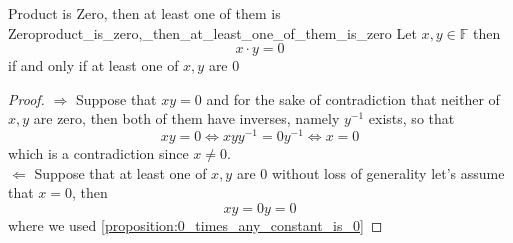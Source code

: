 \begin{proposition}{Product is Zero, then at least one of them is
Zero}{product_is_zero,_then_at_least_one_of_them_is_zero}
Let \(  x, y \in  \mathbb{F} \) then 
\[
x \cdot y =  0
\] 
if and only if at least one of \( x, y \) are \( 0 \) 
\end{proposition}
\begin{proof}
    \( \Rightarrow \) Suppose that \( x y = 0 \) and for the sake of
    contradiction that neither of \( x,y \) are zero, then both of them have
    inverses, namely \( y ^{-1}  \) exists, so that
    \[
    x y = 0 \Leftrightarrow xy y ^{-1} = 0 y ^{-1} \Leftrightarrow x = 0
    \]
    which is a contradiction since \( x \neq 0 \).\\
    \( \Leftarrow  \) Suppose that at least one of \( x, y \) are \( 0 \)
    without loss of generality let's assume that \( x = 0 \), then 
    \[
    x y =  0 y = 0
    \]
    where we used \ref{proposition:0_times_any_constant_is_0}
\end{proof}

